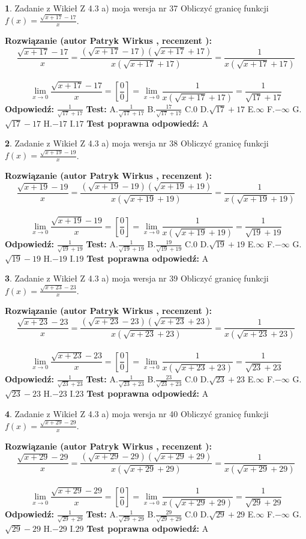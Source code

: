 \documentclass[12pt, a4paper]{article}
\theoremstyle{definition} %
\newtheorem{zad}{}
\newcommand{\zadStart}[1]{\begin{zad}#1\newline}
\newcommand{\zadStop}{\end{zad}}
\newcommand{\rozwStart}[2]{\noindent \textbf{Rozwiązanie (autor #1 , recenzent #2): }\newline}
\newcommand{\rozwStop}{\newline}
\newcommand{\odpStart}{\noindent \textbf{Odpowiedź:}\newline}
\newcommand{\odpStop}{\newline}
\newcommand{\testStart}{\noindent \textbf{Test:}\newline}
\newcommand{\testStop}{\newline}
\newcommand{\kluczStart}{\noindent \textbf{Test poprawna odpowiedź:}\newline}
\newcommand{\kluczStop}{\newline}
\begin{document}
\zadStart{Zadanie z Wikieł Z 4.3 a) moja wersja nr 37}
Obliczyć granicę funkcji $f(x)=\frac{\sqrt{x+17}-17}{x}$.
\zadStop
\rozwStart{Patryk Wirkus}{}
$$\frac{\sqrt{x+17}-17}{x}=\frac{(\sqrt{x+17}-17)(\sqrt{x+17}+17)}{x(\sqrt{x+17}+17)}=\frac{1}{x(\sqrt{x+17}+17)}$$
\\
$$\lim\limits_{x\to0}\frac{\sqrt{x+17}-17}{x}=[\frac{0}{0}]=
\lim\limits_{x\to0}\frac{1}{x(\sqrt{x+17}+17)} = \frac{1}{\sqrt{17}+17}$$
\rozwStop
\odpStart
$\frac{1}{\sqrt{17}+17}$
\odpStop
\testStart
A.$\frac{1}{\sqrt{17}+17}$
B.$\frac{17}{\sqrt{17}+17}$
C.$0$
D.$\sqrt{17}+17$
E.$\infty$
F.$-\infty$
G.$\sqrt{17}-17$
H.$-17$
I.$17$
\testStop
\kluczStart
A
\kluczStop



\zadStart{Zadanie z Wikieł Z 4.3 a) moja wersja nr 38}
Obliczyć granicę funkcji $f(x)=\frac{\sqrt{x+19}-19}{x}$.
\zadStop
\rozwStart{Patryk Wirkus}{}
$$\frac{\sqrt{x+19}-19}{x}=\frac{(\sqrt{x+19}-19)(\sqrt{x+19}+19)}{x(\sqrt{x+19}+19)}=\frac{1}{x(\sqrt{x+19}+19)}$$
\\
$$\lim\limits_{x\to0}\frac{\sqrt{x+19}-19}{x}=[\frac{0}{0}]=
\lim\limits_{x\to0}\frac{1}{x(\sqrt{x+19}+19)} = \frac{1}{\sqrt{19}+19}$$
\rozwStop
\odpStart
$\frac{1}{\sqrt{19}+19}$
\odpStop
\testStart
A.$\frac{1}{\sqrt{19}+19}$
B.$\frac{19}{\sqrt{19}+19}$
C.$0$
D.$\sqrt{19}+19$
E.$\infty$
F.$-\infty$
G.$\sqrt{19}-19$
H.$-19$
I.$19$
\testStop
\kluczStart
A
\kluczStop



\zadStart{Zadanie z Wikieł Z 4.3 a) moja wersja nr 39}
Obliczyć granicę funkcji $f(x)=\frac{\sqrt{x+23}-23}{x}$.
\zadStop
\rozwStart{Patryk Wirkus}{}
$$\frac{\sqrt{x+23}-23}{x}=\frac{(\sqrt{x+23}-23)(\sqrt{x+23}+23)}{x(\sqrt{x+23}+23)}=\frac{1}{x(\sqrt{x+23}+23)}$$
\\
$$\lim\limits_{x\to0}\frac{\sqrt{x+23}-23}{x}=[\frac{0}{0}]=
\lim\limits_{x\to0}\frac{1}{x(\sqrt{x+23}+23)} = \frac{1}{\sqrt{23}+23}$$
\rozwStop
\odpStart
$\frac{1}{\sqrt{23}+23}$
\odpStop
\testStart
A.$\frac{1}{\sqrt{23}+23}$
B.$\frac{23}{\sqrt{23}+23}$
C.$0$
D.$\sqrt{23}+23$
E.$\infty$
F.$-\infty$
G.$\sqrt{23}-23$
H.$-23$
I.$23$
\testStop
\kluczStart
A
\kluczStop



\zadStart{Zadanie z Wikieł Z 4.3 a) moja wersja nr 40}
Obliczyć granicę funkcji $f(x)=\frac{\sqrt{x+29}-29}{x}$.
\zadStop
\rozwStart{Patryk Wirkus}{}
$$\frac{\sqrt{x+29}-29}{x}=\frac{(\sqrt{x+29}-29)(\sqrt{x+29}+29)}{x(\sqrt{x+29}+29)}=\frac{1}{x(\sqrt{x+29}+29)}$$
\\
$$\lim\limits_{x\to0}\frac{\sqrt{x+29}-29}{x}=[\frac{0}{0}]=
\lim\limits_{x\to0}\frac{1}{x(\sqrt{x+29}+29)} = \frac{1}{\sqrt{29}+29}$$
\rozwStop
\odpStart
$\frac{1}{\sqrt{29}+29}$
\odpStop
\testStart
A.$\frac{1}{\sqrt{29}+29}$
B.$\frac{29}{\sqrt{29}+29}$
C.$0$
D.$\sqrt{29}+29$
E.$\infty$
F.$-\infty$
G.$\sqrt{29}-29$
H.$-29$
I.$29$
\testStop
\kluczStart
A
\kluczStop
\end{document}

